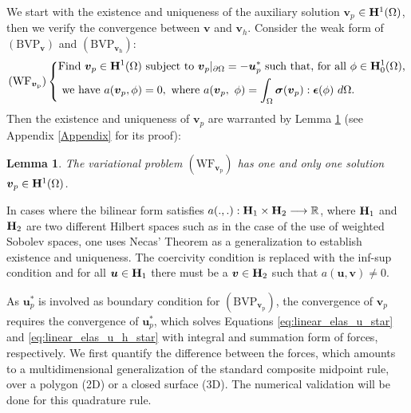 \documentclass[pdflatex,sn-mathphys-num]{sn-jnl}
\newtheorem{lemma}{Lemma}
\newtheorem*{lemma star}{Lemma}
\begin{document}
We start with the existence and uniqueness of the auxiliary solution $\boldsymbol{v}_p$ $\in {\bf{H}}^1(\Omega)$, then we verify the convergence between $\boldsymbol{v}$ and $\boldsymbol{v}_h$. Consider the weak form of $\mathrm{(BVP_{\boldsymbol v})}$ and $\mathrm{(BVP_{{\boldsymbol v}_h})}$:
\begin{equation*}
    \mathrm{(WF_{{\boldsymbol v}_p})}\left\{
\begin{aligned}
    &\text{Find ${\boldsymbol v}_p \in {\bf H}^1(\Omega)$ subject to ${\boldsymbol v}_p|_{\partial \Omega} = -{\boldsymbol u}_p^*$ such that, for all ${\bf \phi} \in {\bf H}_0^1(\Omega)$,}
\\ &\text{ we have }
    a({\boldsymbol v}_p,{\bf \phi)} = 0,
\text{ where } 
a({\boldsymbol v}_{p},~\phi ) = {\int_{\Omega}\boldsymbol{\sigma}{(\boldsymbol {v}_{p})}}:\boldsymbol {\epsilon} (\phi )~d\Omega.
\end{aligned}
    \right.
\end{equation*}
Then the existence and uniqueness of $\boldsymbol{v}_p$ are warranted by Lemma \ref{lemma: uniqueness of v_p} (see Appendix \ref{Appendix} for its proof):
\begin{lemma}\label{lemma: uniqueness of v_p}
    The variational problem $\mathrm{(WF_{{\boldsymbol v}_p})}$ has one and only one solution ${\boldsymbol v}_p \in {\bf H}^1(\Omega)$.
    \label{existence}
\end{lemma}

In cases where the bilinear form satisfies $a(.,.):{\bf H}_1 \times {\bf H}_2 \longrightarrow \mathbb{R}$, where ${\bf H}_1$ and ${\bf H}_2$ are two different Hilbert spaces such as in the case of the use of weighted Sobolev spaces, one uses Necas' Theorem \citep{Brenner_Scott} as a generalization to establish existence and uniqueness. The coercivity condition is replaced with the inf-sup condition and for all ${\boldsymbol u} \in {\bf H}_1$ there must be a ${\boldsymbol v} \in {\bf H}_2$ such that $a(\boldsymbol u,\boldsymbol v) \ne 0$.

As $\boldsymbol{u}_p^*$ is involved as boundary condition for $\mathrm{(BVP_{{\boldsymbol v}_p})}$, the convergence of $\boldsymbol{v}_p$ requires the convergence of $\boldsymbol{u}_p^*$, which solves Equations \eqref{eq:linear_elas_u_star} and \eqref{eq:linear_elas_u_h_star} with integral and summation form of forces, respectively.
We first quantify the difference between the forces, which amounts to a multidimensional generalization of the standard composite midpoint rule, over a polygon (2D) or a closed surface (3D). The numerical validation will be done for this quadrature rule.
\end{document}
